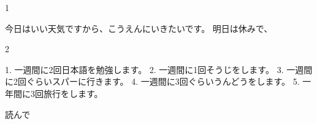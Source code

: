 1

今日はいい天気ですから、こうえんにいきたいです。
明日は休みで、

2

1. 一週間に2回日本語を勉強します。
2. 一週間に1回そうじをします。
3. 一週間に2回ぐらいスパーに行きます。
4. 一週間に3回ぐらいうんどうをします。
5. 一年間に3回旅行をします。

読んで
